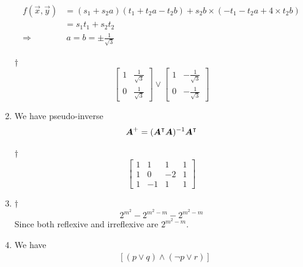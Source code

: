 \documentclass[a4paper,12pt]{article}
\begin{document}
\begin{enumerate}
\begin{equation}
\begin{aligned}
            f(\vec{x}, \vec{y}) & = (s_1 + s_2a)(t_1 + t_2a - t_2b) + s_2b \times (-t_1 - t_2a + 4 \times t_2b) \\
            & = s_1t_1 + s_2t_2 \\
            \Rightarrow & \ a = b = \pm \frac{1}{\sqrt{3}}
        \end{aligned}
    \end{equation}
    \begin{answer}{$\dag$}\begin{equation}
            \begin{bmatrix}
                1 & \frac{1}{\sqrt{3}} \\
                0 & \frac{1}{\sqrt{3}}
            \end{bmatrix} \lor \begin{bmatrix}
                1 & -\frac{1}{\sqrt{3}} \\
                0 & -\frac{1}{\sqrt{3}}
            \end{bmatrix}            
        \end{equation}
    \end{answer}
    \item We have pseudo-inverse \begin{equation}
        \boldsymbol{A}^{+} = (\boldsymbol{A}^\intercal\boldsymbol{A})^{-1}\boldsymbol{A}^\intercal
    \end{equation}
    \begin{answer}{$\dag$}\begin{equation}
            \begin{bmatrix}
                1 & 1 & 1 & 1 \\
                1 & 0 & -2 & 1 \\
                1 & -1 & 1 & 1
            \end{bmatrix}
        \end{equation}
    \end{answer}
    \item \begin{answer}{$\dag$}\begin{equation}
            2^{m^2} - 2^{m^2 - m} - 2^{m^2 - m} 
        \end{equation} Since both reflexive and irreflexive are $2^{m^2 - m}$.
    \end{answer}
    \item We have \begin{equation}
        \begin{aligned}
            & [(p \lor q) \land (\neg p \lor r)] \\

\end{aligned}
\end{equation}
\end{enumerate}
\end{document}
